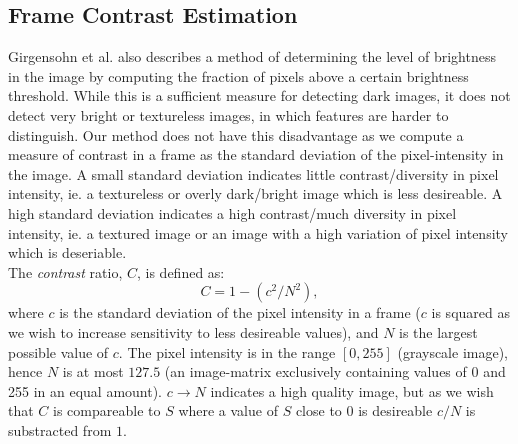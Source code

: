 \subsection{Frame Contrast Estimation}
%
Girgensohn et al. \cite{Girgensohn:2000:SAH:354401.354415} also describes a method of determining the level of brightness in the image by computing the fraction of pixels above a certain brightness threshold. While this is a sufficient measure for detecting dark images, it does not detect very bright or textureless images, in which features are harder to distinguish. Our method does not have this disadvantage as we compute a measure of contrast in a frame as the standard deviation of the pixel-intensity in the image.
A small standard deviation indicates little contrast/diversity in pixel intensity, ie. a textureless or overly dark/bright image which is less desireable.
A high standard deviation indicates a high contrast/much diversity in pixel intensity, ie. a textured image or an image with a high variation of pixel intensity which is deseriable.\\
% 
The \textit{contrast} ratio, $C$, is defined as:
\[
C = 1 - (c^2 / N^2),
\]
where $c$ is the standard deviation of the pixel intensity in a frame ($c$ is squared as we wish to increase sensitivity to less desireable values), and $N$ is the largest possible value of $c$. The pixel intensity is in the range $[0,255]$ (grayscale image), hence $N$ is at most $127.5$ (an image-matrix exclusively containing values of 0 and 255 in an equal amount). $c \to N$ indicates a high quality image, but as we wish that $C$ is compareable to $S$ where a value of $S$ close to 0 is desireable $c/N$ is substracted from $1$.\\
%
